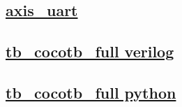 \documentclass{article}
\begin{document}
  


  \subsection{\href{../files/axis_uart-v.html}{axis\_uart}}

  \subsection{\href{../files2/tb_cocotb_full-v.html}{tb\_cocotb\_full verilog}}

  \subsection{\href{../files2/tb_cocotb_full-py.html}{tb\_cocotb\_full python}}
\end{document}
